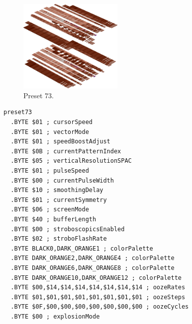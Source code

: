\begin{minipage}[b]{0.48\linewidth}
\begin{figure}[H]                                                          
  \centering                                                             
  \begin{adjustbox}{width=5cm,center}                                   
  \includegraphics[width=5cm]{src/colorspace_presets/preset73-45.png}%
  \end{adjustbox}                                                        
\caption*{Preset 73.}                                           
\end{figure}                                                               
\end{minipage}
\hspace{0.1cm}
\begin{minipage}[b]{0.48\linewidth}                                       
\begin{lstlisting}[basicstyle=\ttfamily\tiny]
preset73
  .BYTE $01 ; cursorSpeed
  .BYTE $01 ; vectorMode
  .BYTE $01 ; speedBoostAdjust
  .BYTE $0B ; currentPatternIndex
  .BYTE $05 ; verticalResolutionSPAC
  .BYTE $01 ; pulseSpeed
  .BYTE $00 ; currentPulseWidth
  .BYTE $10 ; smoothingDelay
  .BYTE $01 ; currentSymmetry
  .BYTE $06 ; screenMode
  .BYTE $40 ; bufferLength
  .BYTE $00 ; stroboscopicsEnabled
  .BYTE $02 ; stroboFlashRate
  .BYTE BLACK0,DARK_ORANGE1 ; colorPalette
  .BYTE DARK_ORANGE2,DARK_ORANGE4 ; colorPalette
  .BYTE DARK_ORANGE6,DARK_ORANGE8 ; colorPalette
  .BYTE DARK_ORANGE10,DARK_ORANGE12 ; colorPalette
  .BYTE $00,$14,$14,$14,$14,$14,$14,$14 ; oozeRates
  .BYTE $01,$01,$01,$01,$01,$01,$01,$01 ; oozeSteps
  .BYTE $0F,$00,$00,$00,$00,$00,$00,$00 ; oozeCycles
  .BYTE $00 ; explosionMode
\end{lstlisting}
\end{minipage}

